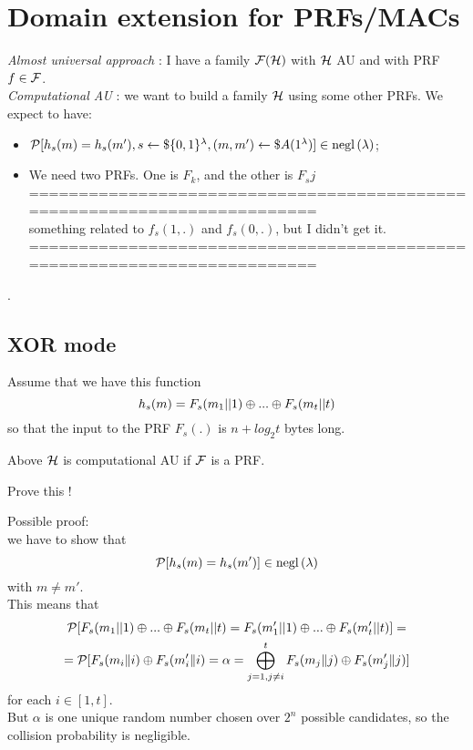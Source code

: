 \section{Domain extension for PRFs/MACs}

\textit{Almost universal approach} : I have a family $\mathcal{F}(\mathcal{H})$ with $\mathcal{H}$ AU and
with PRF $f \in \mathcal{F}$.\\

\textit{Computational AU} : we want to build a family $\mathcal{H}$ using some other
PRFs. We expect to have:
\begin{itemize}
    \item $ \mathcal{P} [ h_{s}(m)=h_{s}(m'), s\leftarrow\$\{0,1\}^{\lambda} , (m,
        m')\leftarrow\$A(1^{\lambda}) ] \in \mathrm{negl}\left({\lambda}\right) $;
    \item We need two PRFs. One is $F_{k}$, and the other is $F_{s}j$\\
=========================================================================\\
something related to $f_{s}(1,.)$ and $f_{s}(0, . )$, but I didn't get it. \\
=========================================================================\\
\end{itemize}.

\subsection{XOR mode}
Assume that we have this function
\[
    h_{s}(m)=F_{s}(m_{1}||1) \oplus ... \oplus F_{s}(m_{t}||t)
\]
so that the input to the PRF $F_{s}(.)$ is $n + log_{2} t$ bytes long.
\begin{lemma}
    Above $\mathcal{H}$ is computational AU if $\mathcal{F}$ is a PRF.
\end{lemma}
\begin{exercise}
    Prove this !
\end{exercise}
Possible proof:\\

we have to show that
\[
    \mathcal{P} [ h_{s}(m)=h_{s}(m') ] \in \mathrm{negl}\left({\lambda}\right)   
\]
with $m\not=m'$.\\
This means that 
    \begin{gather*}
        \mathcal{P} [F_{s}(m_{1}||1) \oplus ... \oplus F_{s}(m_{t}||t) = F_{s}(m'_{1}||1) \oplus ...
        \oplus F_{s}(m'_{t}||t)]  =\\
        = \mathcal{P} [ F_{s}(m_{i}\|i) \oplus  F_{s}(m'_{i}\|i)= \alpha  = \bigoplus_{j=1, j\not=i}^{t} 
        F_{s}(m_{j}\|j) \oplus  F_{s}(m'_{j}\|j)]
    \end{gather*}
    for each $i \in [1,t]$.\\
    But $\alpha$ is one unique random number chosen over $2^{n}$ possible
    candidates, so the collision probability is negligible.\\
